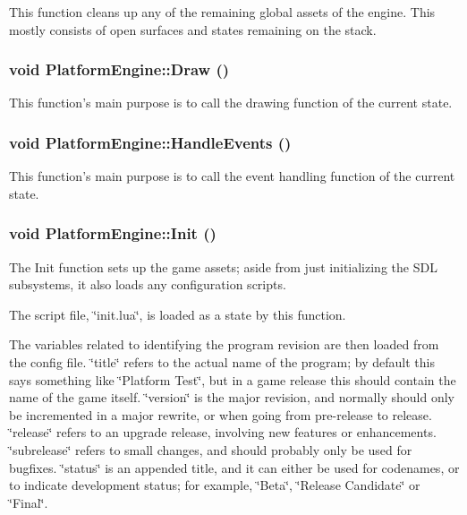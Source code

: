 This function cleans up any of the remaining global assets of the engine. This mostly consists of open surfaces and states remaining on the stack. \hypertarget{class_platform_engine_cd756d58f81c5e28efe98ae075367a5c}{
\subsubsection[{Draw}]{\setlength{\rightskip}{0pt plus 5cm}void PlatformEngine::Draw ()}}
\label{db/da1/class_platform_engine_cd756d58f81c5e28efe98ae075367a5c}


This function's main purpose is to call the drawing function of the current state. \hypertarget{class_platform_engine_7fc47bff353292f1a1435d78664df36d}{
\subsubsection[{HandleEvents}]{\setlength{\rightskip}{0pt plus 5cm}void PlatformEngine::HandleEvents ()}}
\label{db/da1/class_platform_engine_7fc47bff353292f1a1435d78664df36d}


This function's main purpose is to call the event handling function of the current state. \hypertarget{class_platform_engine_059814bb3f1815b15d5a892f8ea6cb4a}{
\subsubsection[{Init}]{\setlength{\rightskip}{0pt plus 5cm}void PlatformEngine::Init ()}}
\label{db/da1/class_platform_engine_059814bb3f1815b15d5a892f8ea6cb4a}


The Init function sets up the game assets; aside from just initializing the SDL subsystems, it also loads any configuration scripts. 

The script file, \char`\"{}init.lua\char`\"{}, is loaded as a state by this function.

The variables related to identifying the program revision are then loaded from the config file. \char`\"{}title\char`\"{} refers to the actual name of the program; by default this says something like \char`\"{}Platform Test\char`\"{}, but in a game release this should contain the name of the game itself. \char`\"{}version\char`\"{} is the major revision, and normally should only be incremented in a major rewrite, or when going from pre-release to release. \char`\"{}release\char`\"{} refers to an upgrade release, involving new features or enhancements. \char`\"{}subrelease\char`\"{} refers to small changes, and should probably only be used for bugfixes. \char`\"{}status\char`\"{} is an appended title, and it can either be used for codenames, or to indicate development status; for example, \char`\"{}Beta\char`\"{}, \char`\"{}Release Candidate\char`\"{} or \char`\"{}Final\char`\"{}.

